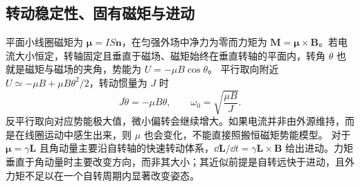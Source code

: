 \subsection{转动稳定性、固有磁矩与进动}
平面小线圈磁矩为 $\boldsymbol\mu=IS\boldsymbol n$，在匀强外场中净力为零而力矩为 $\boldsymbol M=\boldsymbol\mu\times\boldsymbol B$。若电流大小恒定，转轴固定且垂直于磁场、磁矩始终在垂直转轴的平面内，转角 $\theta$ 也就是磁矩与磁场的夹角，势能为 $U=-\mu B\cos\theta$。
平行取向附近 $U\simeq-\mu B+\mu B\theta^2/2$，转动惯量为 $J$ 时
\[
 J\ddot\theta=-\mu B\theta,\qquad \omega_0=\sqrt{\frac{\mu B}{J}}.
\]
反平行取向对应势能极大值，微小偏转会继续增大。如果电流并非由外源维持，而是在线圈运动中感生出来，则 $\mu$ 也会变化，不能直接照搬恒磁矩势能模型。
对于 $\boldsymbol\mu=\gamma\boldsymbol L$ 且角动量主要沿自转轴的快速转动体系，$\dd\boldsymbol L/\dd t=\gamma\boldsymbol L\times\boldsymbol B$ 给出进动。力矩垂直于角动量时主要改变方向，而非其大小；其近似前提是自转远快于进动，且外力矩不足以在一个自转周期内显著改变姿态。

